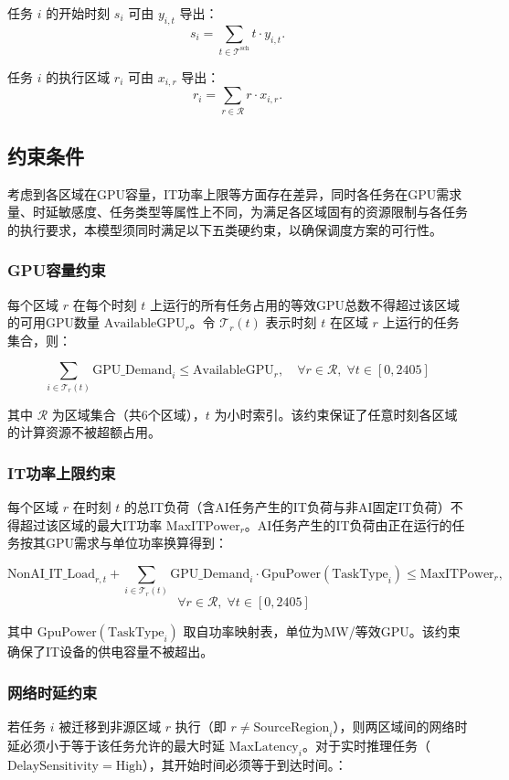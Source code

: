\documentclass[UTF8,a4paper,zihao=-4]{ctexart}
\begin{document}
任务 $i$ 的开始时刻 $s_i$ 可由 $y_{i,t}$ 导出：
\[
s_i = \sum_{t \in \mathcal{T}^{\text{sch}}} t \cdot y_{i,t}.
\]

任务 $i$ 的执行区域 $r_i$ 可由 $x_{i,r}$ 导出：
\[
r_i = \sum_{r \in \mathcal{R}} r \cdot x_{i,r}.
\]
\subsection{约束条件}
考虑到各区域在GPU容量，IT功率上限等方面存在差异，同时各任务在GPU需求量、时延敏感度、任务类型等属性上不同，为满足各区域固有的资源限制与各任务的执行要求，本模型须同时满足以下五类硬约束，以确保调度方案的可行性。

\subsubsection{GPU容量约束}
每个区域 \(r\) 在每个时刻 \(t\) 上运行的所有任务占用的等效GPU总数不得超过该区域的可用GPU数量 \(\mathrm{AvailableGPU}_r\)。令 \(\mathcal{T}_r(t)\) 表示时刻 \(t\) 在区域 \(r\) 上运行的任务集合，则：

\[
\sum_{i \in \mathcal{T}_r(t)} \mathrm{GPU\_Demand}_i \leq \mathrm{AvailableGPU}_r, \quad \forall r \in \mathcal{R},\; \forall t \in [0,2405]
\]

其中 \(\mathcal{R}\) 为区域集合（共6个区域），\(t\) 为小时索引。该约束保证了任意时刻各区域的计算资源不被超额占用。

\subsubsection{IT功率上限约束}
每个区域 \(r\) 在时刻 \(t\) 的总IT负荷（含AI任务产生的IT负荷与非AI固定IT负荷）不得超过该区域的最大IT功率 \(\mathrm{MaxITPower}_r\)。AI任务产生的IT负荷由正在运行的任务按其GPU需求与单位功率换算得到：

\[
\mathrm{NonAI\_IT\_Load}_{r,t} + \sum_{i \in \mathcal{T}_r(t)} \mathrm{GPU\_Demand}_i \cdot \mathrm{GpuPower}(\mathrm{TaskType}_i) \leq \mathrm{MaxITPower}_r,\]
\[
\quad \forall r \in \mathcal{R},\; \forall t \in [0,2405]
\]

其中 \(\mathrm{GpuPower}(\mathrm{TaskType}_i)\) 取自功率映射表，单位为MW/等效GPU。该约束确保了IT设备的供电容量不被超出。

\subsubsection{网络时延约束}
若任务 \(i\) 被迁移到非源区域 \(r\) 执行（即 \(r \neq \mathrm{SourceRegion}_i\)），则两区域间的网络时延必须小于等于该任务允许的最大时延 \(\mathrm{MaxLatency}_i\)。对于实时推理任务（\(\mathrm{DelaySensitivity}=\text{High}\)），其开始时间必须等于到达时间。：
\end{document}
